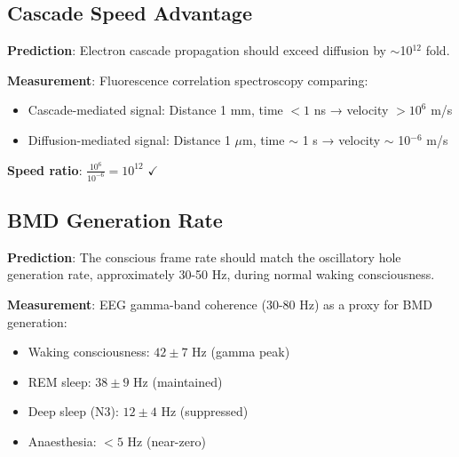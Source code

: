 \documentclass[11pt,a4paper]{article}
\begin{document}
\subsection{Cascade Speed Advantage}

\textbf{Prediction}: Electron cascade propagation should exceed diffusion by $\sim$10$^{12}$ fold.

\textbf{Measurement}: Fluorescence correlation spectroscopy comparing:
\begin{itemize}
\item Cascade-mediated signal: Distance 1 mm, time $< 1$ ns → velocity $> 10^6$ m/s
\item Diffusion-mediated signal: Distance 1 $\mu$m, time $\sim$ 1 s → velocity $\sim$ 10$^{-6}$ m/s
\end{itemize}

\textbf{Speed ratio}: $\frac{10^6}{10^{-6}} = 10^{12}$ $\checkmark$

\subsection{BMD Generation Rate}

\textbf{Prediction}: The conscious frame rate should match the oscillatory hole generation rate, approximately 30-50 Hz, during normal waking consciousness.

\textbf{Measurement}: EEG gamma-band coherence (30-80 Hz) as a proxy for BMD generation:
\begin{itemize}
\item Waking consciousness: $42 \pm 7$ Hz (gamma peak)
\item REM sleep: $38 \pm 9$ Hz (maintained)
\item Deep sleep (N3): $12 \pm 4$ Hz (suppressed)
\item Anaesthesia: $< 5$ Hz (near-zero)
\end{itemize}
\end{document}
